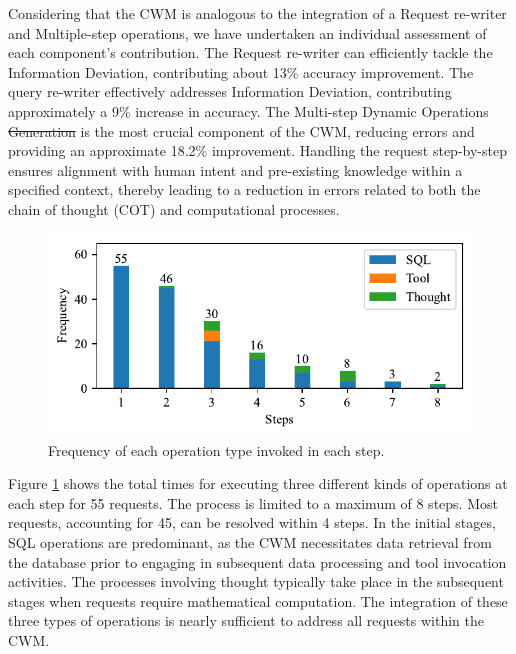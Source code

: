 \documentclass[preprint,12pt]{elsarticle}
\providecommand{\DIFaddtex}[1]{{\protect\color{blue}\uwave{#1}}} %
\providecommand{\DIFdeltex}[1]{{\protect\color{red}\sout{#1}}}                      %
\providecommand{\DIFaddbegin}{} %
\providecommand{\DIFaddend}{} %
\providecommand{\DIFdelbegin}{} %
\providecommand{\DIFdelend}{} %
\providecommand{\DIFadd}[1]{\texorpdfstring{\DIFaddtex{#1}}{#1}} %
\providecommand{\DIFdel}[1]{\texorpdfstring{\DIFdeltex{#1}}{}} %
\newcommand{\DIFscaledelfig}{0.5}
\newlength{\DIFdelgraphicswidth} %
\newlength{\DIFdelgraphicsheight} %
\newcommand{\DIFaddincludegraphics}[2][]{{\color{blue}\fbox{\DIFOincludegraphics[#1]{#2}}}} %
\newcommand{\DIFdelincludegraphics}[2][]{%
\sbox{\DIFdelgraphicsbox}{\DIFOincludegraphics[#1]{#2}}%
\settoboxwidth{\DIFdelgraphicswidth}{\DIFdelgraphicsbox} %
\settoboxtotalheight{\DIFdelgraphicsheight}{\DIFdelgraphicsbox} %
\scalebox{\DIFscaledelfig}{%
\parbox[b]{\DIFdelgraphicswidth}{\usebox{\DIFdelgraphicsbox}\\[-\baselineskip] \rule{\DIFdelgraphicswidth}{0em}}\llap{\resizebox{\DIFdelgraphicswidth}{\DIFdelgraphicsheight}{%
\setlength{\unitlength}{\DIFdelgraphicswidth}%
\begin{picture}(1,1)%
\thicklines\linethickness{2pt} %
{\color[rgb]{1,0,0}\put(0,0){\framebox(1,1){}}}%
{\color[rgb]{1,0,0}\put(0,0){\line( 1,1){1}}}%
{\color[rgb]{1,0,0}\put(0,1){\line(1,-1){1}}}%
\end{picture}%
}\hspace*{3pt}}} %
} %
\DeclareRobustCommand{\DIFaddbegin}{\DIFOaddbegin \let\includegraphics\DIFaddincludegraphics} %
\DeclareRobustCommand{\DIFaddend}{\DIFOaddend \let\includegraphics\DIFOincludegraphics} %
\DeclareRobustCommand{\DIFdelbegin}{\DIFOdelbegin \let\includegraphics\DIFdelincludegraphics} %
\DeclareRobustCommand{\DIFdelend}{\DIFOaddend \let\includegraphics\DIFOincludegraphics} %
\begin{document}
Considering that the CWM is analogous to the integration of a Request re-writer and Multiple-step operations, we have undertaken an individual assessment of each component's contribution.
The Request re-writer can efficiently tackle the Information Deviation, contributing about 13\% accuracy improvement.
The query re-writer effectively addresses Information Deviation, contributing approximately a 9\% increase in accuracy. 
The Multi-step Dynamic Operations \DIFdelbegin \DIFdel{Generation }\DIFdelend \DIFaddbegin \DIFadd{Planning and Execution }\DIFaddend is the most crucial component of the CWM, reducing errors and providing an approximate 18.2\% improvement. 
Handling the request step-by-step ensures alignment with human intent and pre-existing knowledge within a specified context, thereby leading to a reduction in errors related to both the chain of thought (COT) and computational processes.

\begin{figure}[t]%
\centering%
\includegraphics[width=0.8\linewidth]{figs/stacked_bar_chart.pdf}
\caption{Frequency of each operation type invoked in each step.}
\label{fig:dist_operation}
\end{figure}
Figure \ref{fig:dist_operation} shows the total times for executing three different kinds of operations at each step for 55 requests.
The process is limited to a maximum of 8 steps. 
Most requests, accounting for 45, can be resolved within 4 steps.
In the initial stages, SQL operations are predominant, as the CWM necessitates data retrieval from the database prior to engaging in subsequent data processing and tool invocation activities. 
The processes involving thought typically take place in the subsequent stages when requests require mathematical computation. 
The integration of these three types of operations is nearly sufficient to address all requests within the CWM.
\end{document}
